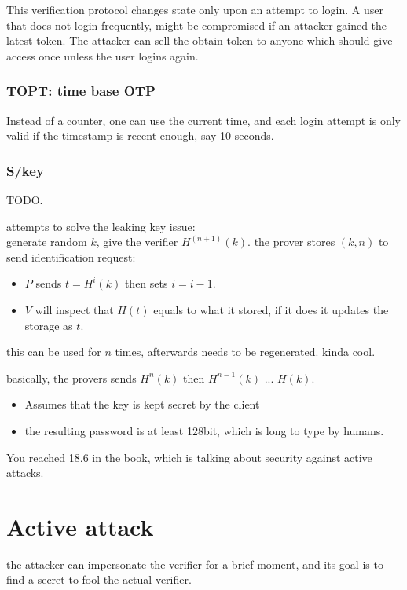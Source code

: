 \begin{remark}
This verification protocol changes state only upon an attempt to login.
A user that does not login frequently, might be compromised if an
attacker gained the latest token. The attacker can sell the obtain
token to anyone which should give access once unless the user logins
again. 
\end{remark}


\subsubsection{TOPT: time base OTP }

Instead of a counter, one can use the current time, and each login
attempt is only valid if the timestamp is recent enough, say 10 seconds.

\subsubsection{S/key }

TODO.

attempts to solve the leaking key issue: \\
generate random $k$, give the verifier $H^{(n+1)}(k)$. the prover
stores $(k,n)$ to send identification request: 
\begin{itemize}
\item $P$ sends $t=H^{i}(k)$ then sets $i=i-1$. 
\item $V$ will inspect that $H(t)$ equals to what it stored, if it does
it updates the storage as $t$.
\end{itemize}
this can be used for $n$ times, afterwards needs to be regenerated.
kinda cool. 

basically, the provers sends $H^{n}(k)$ then $H^{n-1}\left(k\right)$
... $H(k)$.
\begin{itemize}
\item Assumes that the key is kept secret by the client
\item the resulting password is at least 128bit, which is long to type by
humans. 
\end{itemize}
%
You reached 18.6 in the book, which is talking about security against
active attacks. 

\section{Active attack}

the attacker can impersonate the verifier for a brief moment, and
its goal is to find a secret to fool the actual verifier. 


